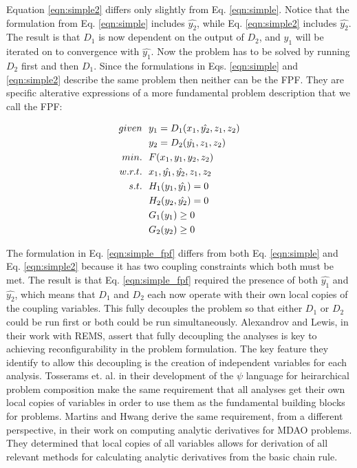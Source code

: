     Equation \ref{eqn:simple2} differs only slightly from Eq. \ref{eqn:simple}. 
    Notice that the formulation from Eq. \ref{eqn:simple} includes 
    $\hat{y_2}$, while Eq. \ref{eqn:simple2} includes $\hat{y_2}$. The result is that
    $D_1$ is now dependent on the output of $D_2$, and $y_1$ will be iterated on to 
    convergence with $\hat{y_1}$. Now the problem has to be solved by running $D_2$ first 
    and then $D_1$. Since the formulations in Eqs. \ref{eqn:simple} and 
    \ref{eqn:simple2} describe the same problem then neither can be the
    FPF. They are specific alterative expressions of a more fundamental problem description 
    that we call the FPF:

    \begin{align}
        given & \ \ y_1 = D_1(x_1,\hat{y_2},z_1,z_2) \notag
        \\      & \ \ y_2 = D_2(\hat{y_1},z_1,z_2) \notag
        \\min. &\ \ F(x_1,y_1,y_2,z_2) \notag
        \\w.r.t. & \ \ x_1,\hat{y_1},\hat{y_2},z_1,z_2 \notag
        \\s.t. & \ \ H_1(y_1,\hat{y_1}) = 0 \notag
        \\     & \ \ H_2(y_2,\hat{y_2}) = 0 \notag 
        \\     & \ \ G_1(y_1) \geq 0 \notag
        \\     & \ \ G_2(y_2) \geq 0
        \label{eqn:simple_fpf}
    \end{align}

    The formulation in Eq. \ref{eqn:simple_fpf} differs from both Eq. \ref{eqn:simple} 
    and Eq. \ref{eqn:simple2} because it has two coupling constraints which both must be 
    met. The result is that Eq. \ref{eqn:simple_fpf} required the presence of both 
    $\hat{y_1}$ and $\hat{y_2}$, which means that $D_1$ and $D_2$ each now operate with 
    their own local copies of the coupling variables. This fully decouples the problem so that 
    either $D_1$ or $D_2$ could be run first or both could be run simultaneously. 
    Alexandrov and Lewis, in their work with REMS, assert that fully decoupling 
    the analyses is key to achieving reconfigurability in the problem 
    formulation\cite{alexandrov2004}. The key feature they identify to allow this decoupling 
    is the creation of independent variables for each analysis. Tosserams et. al. 
    in their development of the $\psi$ language for heirarchical problem composition
    make the same requirement that all analyses get their own local copies of 
    variables in order to use them as the fundamental building blocks for 
    problems\cite{tosserams2010specification}. Martins and Hwang derive the same requirement,
    from a different perspective, in their work on computing analytic derivatives 
    for MDAO problems\cite{Martins2012}. They determined that local copies of all variables 
    allows for derivation of all relevant methods for calculating analytic derivatives 
    from the basic chain rule. 



